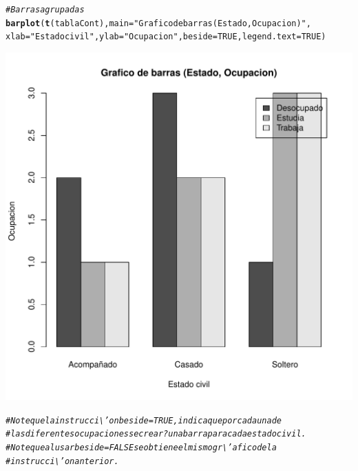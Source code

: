 \documentclass[12pt,letterpaper]{article}\usepackage[]{graphicx}\usepackage[]{color}
\makeatletter
\def\maxwidth{ %
  \ifdim\Gin@nat@width>\linewidth
    \linewidth
  \else
    \Gin@nat@width
  \fi
}
\newcommand{\hlnum}[1]{\textcolor[rgb]{0.686,0.059,0.569}{#1}}%
\newcommand{\hlstr}[1]{\textcolor[rgb]{0.192,0.494,0.8}{#1}}%
\newcommand{\hlcom}[1]{\textcolor[rgb]{0.678,0.584,0.686}{\textit{#1}}}%
\newcommand{\hlstd}[1]{\textcolor[rgb]{0.345,0.345,0.345}{#1}}%
\newcommand{\hlkwc}[1]{\textcolor[rgb]{0.333,0.667,0.333}{#1}}%
\newcommand{\hlkwd}[1]{\textcolor[rgb]{0.737,0.353,0.396}{\textbf{#1}}}%
\newenvironment{kframe}{%
 \def\at@end@of@kframe{}%
 \ifinner\ifhmode%
  \def\at@end@of@kframe{\end{minipage}}%
  \begin{minipage}{\columnwidth}%
 \fi\fi%
 \def\FrameCommand##1{\hskip\@totalleftmargin \hskip-\fboxsep
 \colorbox{shadecolor}{##1}\hskip-\fboxsep
     \hskip-\linewidth \hskip-\@totalleftmargin \hskip\columnwidth}%
 \MakeFramed {\advance\hsize-\width
   \@totalleftmargin\z@ \linewidth\hsize
   \@setminipage}}%
 {\par\unskip\endMakeFramed%
 \at@end@of@kframe}
\newenvironment{knitrout}{}{} %
\makeatother
\begin{document}
\begin{knitrout}
\begin{kframe}
\begin{alltt}
\hlcom{# Barras agrupadas}
\hlkwd{barplot}\hlstd{(}\hlkwd{t}\hlstd{(tablaCont),} \hlkwc{main}\hlstd{=}\hlstr{"Grafico de barras (Estado, Ocupacion)"}\hlstd{,}
        \hlkwc{xlab}\hlstd{=}\hlstr{"Estado civil"}\hlstd{,} \hlkwc{ylab}\hlstd{=}\hlstr{"Ocupacion"}\hlstd{,} \hlkwc{beside}\hlstd{=}\hlnum{TRUE}\hlstd{,} \hlkwc{legend.text}\hlstd{=}\hlnum{TRUE}\hlstd{)}
\end{alltt}
\end{kframe}
\includegraphics[width=\maxwidth]{figure/unnamed-chunk-6-2} 
\begin{kframe}\begin{alltt}
\hlcom{# Note que la instrucci\textbackslash{}'on beside =TRUE, indica que por cada una de }
\hlcom{# las diferentes ocupaciones se crear? una barra para cada estado civil. }
\hlcom{# Note que al usar beside =FALSE se obtiene el mismo gr\textbackslash{}'afico de la }
\hlcom{# instrucci\textbackslash{}'on anterior.}


\end{alltt}
\end{kframe}
\end{knitrout}
\end{document}
